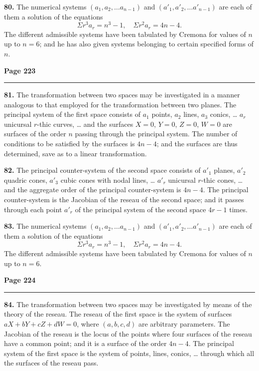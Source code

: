 \documentclass[12pt,a4paper]{article}
\theoremstyle{plain}
\theoremstyle{definition}
\theoremstyle{remark}
\begin{document}
\textbf{80.} The numerical systems $(a_1, a_2, \ldots a_{n-1})$ and $(a'_1, a'_2, \ldots a'_{n-1})$ are each of them a solution of the equations
\[
\Sigma r^3 a_r = n^3 - 1, \quad \Sigma r^2 a_r = 4n - 4.
\]
The different admissible systems have been tabulated by Cremona for values of $n$ up to $n = 6$; and he has also given systems belonging to certain specified forms of $n$.

\newpage
\noindent\textbf{Page 223}\\
\noindent\rule{\textwidth}{0.4pt}

\smallskip

\noindent\textbf{81.} The transformation between two spaces may be investigated in a manner analogous to that employed for the transformation between two planes. The principal system of the first space consists of $a_1$ points, $a_2$ lines, $a_3$ conics, \ldots{} $a_r$ unicursal $r$-thic curves, \ldots{} and the surfaces $X = 0$, $Y = 0$, $Z = 0$, $W = 0$ are surfaces of the order $n$ passing through the principal system. The number of conditions to be satisfied by the surfaces is $4n - 4$; and the surfaces are thus determined, save as to a linear transformation.

\textbf{82.} The principal counter-system of the second space consists of $a'_1$ planes, $a'_2$ quadric cones, $a'_3$ cubic cones with nodal lines, \ldots{} $a'_r$ unicursal $r$-thic cones, \ldots{} and the aggregate order of the principal counter-system is $4n - 4$. The principal counter-system is the Jacobian of the reseau of the second space; and it passes through each point $a'_r$ of the principal system of the second space $4r - 1$ times.

\textbf{83.} The numerical systems $(a_1, a_2, \ldots a_{n-1})$ and $(a'_1, a'_2, \ldots a'_{n-1})$ are each of them a solution of the equations
\[
\Sigma r^3 a_r = n^3 - 1, \quad \Sigma r^2 a_r = 4n - 4.
\]
The different admissible systems have been tabulated by Cremona for values of $n$ up to $n = 6$.

\newpage
\noindent\textbf{Page 224}\\
\noindent\rule{\textwidth}{0.4pt}

\smallskip

\noindent\textbf{84.} The transformation between two spaces may be investigated by means of the theory of the reseau. The reseau of the first space is the system of surfaces $aX + bY + cZ + dW = 0$, where $(a, b, c, d)$ are arbitrary parameters. The Jacobian of the reseau is the locus of the points where four surfaces of the reseau have a common point; and it is a surface of the order $4n - 4$. The principal system of the first space is the system of points, lines, conics, \ldots{} through which all the surfaces of the reseau pass.
\end{document}
